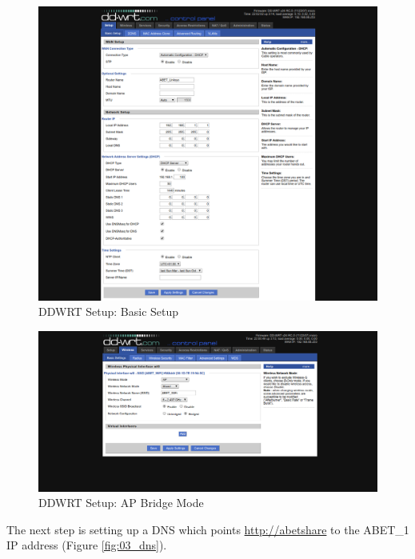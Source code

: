\documentclass{article}
\begin{document}
\begin{figure}[H]
  \begin{center}
    \includegraphics[scale=0.30]{./img/ddwrt/01_basic_setup.png}
  \end{center}
  \caption{DDWRT Setup: Basic Setup}
  \label{fig:01_basic_setup}
\end{figure}

\begin{figure}[H]
  \begin{center}
    \includegraphics[scale=0.30]{./img/ddwrt/02_ap_bridge.png}
  \end{center}
  \caption{DDWRT Setup: AP Bridge Mode}
  \label{fig:02_ap_bridge}
\end{figure}

The next step is setting up a DNS which points \url{http://abetshare} to the
ABET\_1 IP address (Figure \ref{fig:03_dns}).
\end{document}
